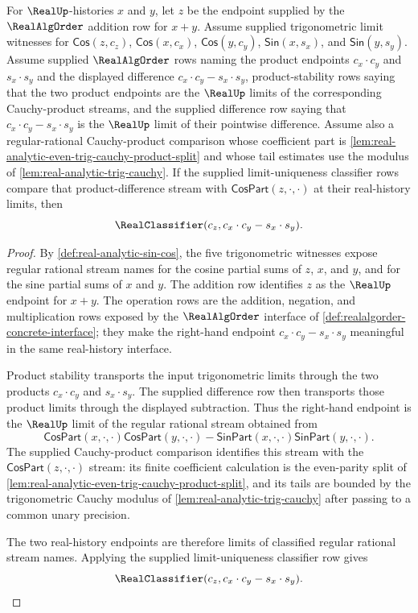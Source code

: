 \begin{theorem}
\label{thm:real-analytic-cos-add}
For $\RealUp$-histories $x$ and $y$, let $z$ be the endpoint supplied by the $\RealAlgOrder$ addition row for $x+y$. Assume supplied trigonometric limit witnesses for $\mathsf{Cos}(z,c_z)$, $\mathsf{Cos}(x,c_x)$, $\mathsf{Cos}(y,c_y)$, $\mathsf{Sin}(x,s_x)$, and $\mathsf{Sin}(y,s_y)$. Assume supplied $\RealAlgOrder$ rows naming the product endpoints $c_x\cdot c_y$ and $s_x\cdot s_y$ and the displayed difference $c_x\cdot c_y-s_x\cdot s_y$, product-stability rows saying that the two product endpoints are the $\RealUp$ limits of the corresponding Cauchy-product streams, and the supplied difference row saying that $c_x\cdot c_y-s_x\cdot s_y$ is the $\RealUp$ limit of their pointwise difference. Assume also a regular-rational Cauchy-product comparison whose coefficient part is \autoref{lem:real-analytic-even-trig-cauchy-product-split} and whose tail estimates use the modulus of \autoref{lem:real-analytic-trig-cauchy}. If the supplied limit-uniqueness classifier rows compare that product-difference stream with $\mathsf{CosPart}(z,\cdot,\cdot)$ at their real-history limits, then
$$
\RealClassifier(c_z, c_x\cdot c_y - s_x\cdot s_y).
$$
\end{theorem}
\begin{proof}
By \autoref{def:real-analytic-sin-cos}, the five trigonometric witnesses expose regular rational stream names for the cosine partial sums of $z$, $x$, and $y$, and for the sine partial sums of $x$ and $y$. The addition row identifies $z$ as the $\RealUp$ endpoint for $x+y$. The operation rows are the addition, negation, and multiplication rows exposed by the $\RealAlgOrder$ interface of \autoref{def:realalgorder-concrete-interface}; they make the right-hand endpoint $c_x\cdot c_y-s_x\cdot s_y$ meaningful in the same real-history interface.

Product stability transports the input trigonometric limits through the two products $c_x\cdot c_y$ and $s_x\cdot s_y$. The supplied difference row then transports those product limits through the displayed subtraction. Thus the right-hand endpoint is the $\RealUp$ limit of the regular rational stream obtained from
$$
\mathsf{CosPart}(x,\cdot,\cdot)\mathsf{CosPart}(y,\cdot,\cdot)
-
\mathsf{SinPart}(x,\cdot,\cdot)\mathsf{SinPart}(y,\cdot,\cdot).
$$
The supplied Cauchy-product comparison identifies this stream with the $\mathsf{CosPart}(z,\cdot,\cdot)$ stream: its finite coefficient calculation is the even-parity split of \autoref{lem:real-analytic-even-trig-cauchy-product-split}, and its tails are bounded by the trigonometric Cauchy modulus of \autoref{lem:real-analytic-trig-cauchy} after passing to a common unary precision.

The two real-history endpoints are therefore limits of classified regular rational stream names. Applying the supplied limit-uniqueness classifier row gives
$$
\RealClassifier(c_z, c_x\cdot c_y - s_x\cdot s_y).
$$
\end{proof}

